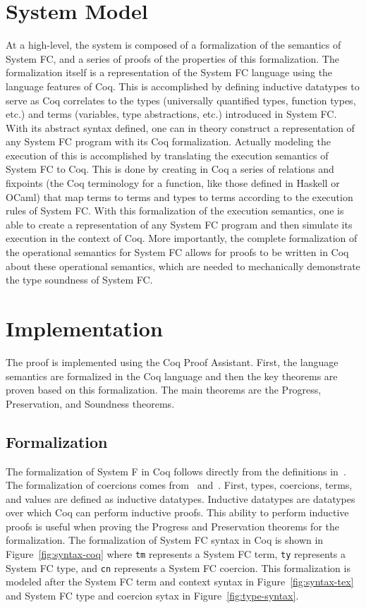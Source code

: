 \documentclass{sig-alternate}
\begin{document}
\section{System Model}
\label{sec:model}
At a high-level, the system is composed of a formalization of the semantics of System FC, and a series of proofs of the properties of this formalization. The formalization itself is a representation of the System FC language using the language features of Coq. This is accomplished by defining inductive datatypes to serve as Coq correlates to the types (universally quantified types, function types, etc.) and terms (variables, type abstractions, etc.) introduced in System FC.  With its abstract syntax defined, one can in theory construct a representation of any System FC program with its Coq formalization. Actually modeling the execution of this is accomplished by translating the execution semantics of System FC to Coq. This is done by creating in Coq a series of relations and fixpoints (the Coq terminology for a function, like those defined in Haskell or OCaml) that map terms to terms and types to terms according to the execution rules of System FC. With this formalization of the execution semantics, one is able to create a representation of any System FC program and then simulate its execution in the context of Coq. More importantly, the complete formalization of the operational semantics for System FC allows for proofs to be written in Coq about these operational semantics, which are needed to mechanically demonstrate the type soundness of System FC.

\section{Implementation}
\label{sec:implementation}

The proof is implemented using the Coq Proof Assistant. First, the language semantics are formalized in the Coq language and then the key theorems are proven based on this formalization. The main theorems are the Progress, Preservation, and Soundness theorems.

\subsection{Formalization}
\label{sec:implementation-formalization}

The formalization of System F in Coq follows directly from the definitions in~\cite{Pierce:TAPL}. The formalization of coercions comes from~\cite{Breitner:2014:SZC:2628136.2628141} and~\cite{DBLP:conf/tldi/YorgeyWCJVM12}. First, types, coercions, terms, and values are defined as inductive datatypes. Inductive datatypes are datatypes over which Coq can perform inductive proofs. This ability to perform inductive proofs is useful when proving the Progress and Preservation theorems for the formalization. The formalization of System FC syntax in Coq is shown in Figure~\ref{fig:syntax-coq} where \texttt{tm} represents a System FC term,  \texttt{ty} represents a System FC type, and \texttt{cn} represents a System FC coercion. This formalization is modeled after the System FC term and context syntax in Figure~\ref{fig:syntax-tex} and System FC type and coercion sytax in Figure~\ref{fig:type-syntax}.
\end{document}
